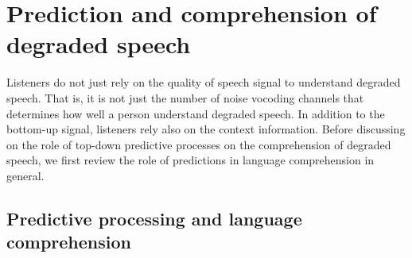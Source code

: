 \documentclass[a4paper, nobind]{templates/ociamthesis}
\begin{document}
\hypertarget{prediction-and-comprehension-of-degraded-speech}{%
\section{Prediction and comprehension of degraded speech}\label{prediction-and-comprehension-of-degraded-speech}}

Listeners do not just rely on the quality of speech signal to understand degraded speech.
That is, it is not just the number of noise vocoding channels that determines how well a person understand degraded speech.
In addition to the bottom-up signal, listeners rely also on the context information.
Before discussing on the role of top-down predictive processes on the comprehension of degraded speech, we first review the role of predictions in language comprehension in general.

\hypertarget{predictive-processing-and-language-comprehension}{%
\subsection{Predictive processing and language comprehension}\label{predictive-processing-and-language-comprehension}}
\end{document}
